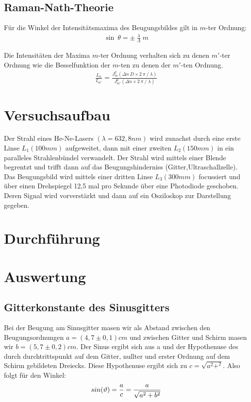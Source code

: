 \documentclass[12pt]{article}
\begin{document}
\subsection{Raman-Nath-Theorie}
Für die Winkel der Intensitätsmaxima des Beugungsbildes gilt in $m$-ter Ordnung:
\begin{align}
 \sin~\theta = \pm~\frac{\lambda}{\Lambda}~m
\end{align}

Die Intensitäten der Maxima $m$-ter Ordnung verhalten sich zu denen $m'$-ter Ordnung wie die Besselfunktion der $m$-ten zu denen der $m'$-ten Ordnung.
\begin{align}
 \frac{I_m}{I_{m'}} = \frac{J^2_m(\Delta n~D \times 2~\pi~/~\lambda)}{J^2_{m'}(\Delta n \times 2~\pi~/~\lambda)}
\end{align}

\section{Versuchsaufbau}
Der Strahl eines He-Ne-Lasers $(\lambda = 632,8nm)$ wird zunachst durch eine erste Linse $L_1(100mm)$ aufgeweitet, dann mit einer zweiten $L_2(150mm)$ in ein paralleles Strahlenbündel verwandelt. Der Strahl wird mittels einer Blende begrentzt und trifft dann auf das Beugungshinderniss (Gitter,Ultraschallzelle). Das Beugungsbild wird mittels einer dritten Linse $L_3(300mm)$ focussiert und über einen Drehspiegel 12,5 mal pro Sekunde über eine Photodiode geschoben. Deren Signal wird vorverstärkt und dann auf ein Osziloskop zur Darstellung gegeben.

\section{Durchführung}

\section{Auswertung}
\subsection{Gitterkonstante des Sinusgitters}
Bei der Beugung am Sinusgitter masen wir als Abstand zwischen den Beugungsordnungen $a=(4,7 \pm 0,1)cm$ und zwischen Gitter und Schirm masen wir $b=(5,7\pm0,2)cm$. Der Sinus ergibt sich aus a und der Hypothenuse des durch durchtrittspunkt auf dem Gitter, nullter und erster Ordnung auf dem Schirm gebildeten Dreiecks. Diese Hypothenuse ergibt sich zu $c=\sqrt{a^2+^2}$. Also folgt für den Winkel:
\begin{align}
\notag
 sin(\vartheta)=\frac{a}{c}=\frac{a}{\sqrt{a^2+b^2}}
\end{align}
\end{document}
